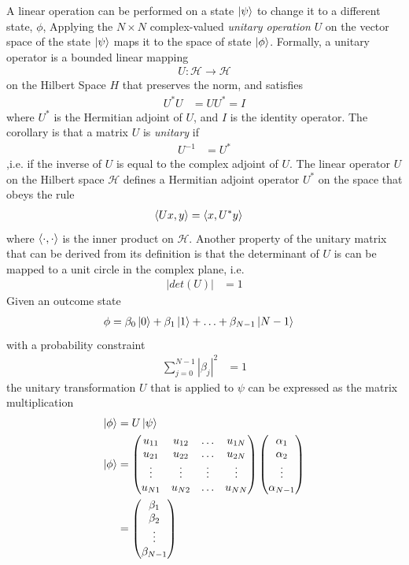 A linear operation can be performed on a state $\ket{\psi}$ to change it to a different state, $\phi$, Applying the $N \times N$ complex-valued \textit{unitary operation} $U$ on the vector space of the state $\ket{\psi}$ maps it to the space of state $\ket{\phi}$. Formally, a unitary operator is a bounded linear mapping 
\begin{align}
	U: \mathcal{H} \rightarrow \mathcal{H}
\end{align}
on the Hilbert Space $H$ that preserves the norm, and satisfies
\begin{align}
	U^{*}U	& = UU^{*} = I
\end{align}
where $U^{*}$ is the Hermitian adjoint of $U$, and $I$ is the identity operator. The corollary is that a matrix $U$ is \textit{unitary} if 
\begin{align}
	U^{-1}	& = U^{*}
\end{align}
,i.e. if the inverse of $U$ is equal to the complex adjoint of $U$. The linear operator $U$ on the Hilbert space $\mathcal{H}$ defines a Hermitian adjoint operator $U^{*}$ on the space that obeys the rule
\begin{align}
	\braket{Ux, y} & = \braket{x, U^{*}y}
\end{align}
where $\braket{\cdot, \cdot}$ is the inner product on $\mathcal{H}$. Another property of the unitary matrix that can be derived from its definition is that the determinant of $U$ is can be mapped to a unit circle in the complex plane, i.e.
\begin{align}
	|det(U)|	& = 1 
\end{align}
Given an outcome state
\begin{align}
	\phi	& = \beta_0\ket{0} + \beta_1\ket{1} + \hdots + \beta_{N-1}\ket{N-1}
\end{align}
with a probability constraint
\begin{align}
	\sum_{j=0}^{N-1} |\beta_j|^2	& = 1
\end{align}
the unitary transformation $U$ that is applied to $\psi$ can be expressed as the matrix multiplication
\begin{align}
	\ket{\phi}	& = U\ket{\psi}\nonumber\\
	\ket{\phi} & = \left(\begin{matrix}
		u_{11} & u_{12} & \hdots & u_{1N}\\
		u_{21} & u_{22} & \hdots & u_{2N}\\
		\vdots & \vdots & \vdots & \vdots\\
		u_{N1} & u_{N2} & \hdots & u_{NN}
	\end{matrix}\right) 	\left(\begin{matrix}
	\alpha_{1} \\
	\alpha_{2} \\
	\vdots \\
	\alpha_{N-1}
\end{matrix}\right)	\nonumber\\ & = \left(\begin{matrix}
\beta_{1} \\
\beta_{2} \\
\vdots \\
\beta_{N-1}
\end{matrix}\right)
\end{align}
